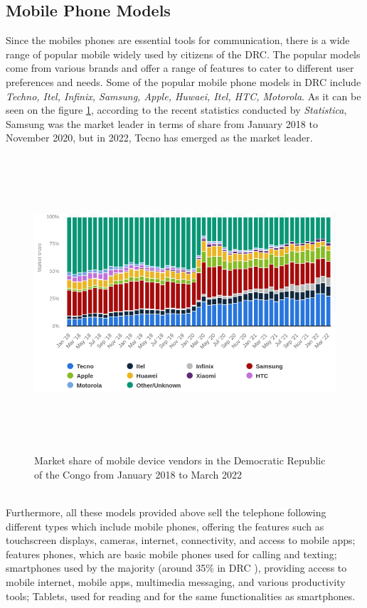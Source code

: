\documentclass[12pt,a4paper]{report}
\begin{document}
	\subsection{Mobile Phone Models}  
	Since the mobiles phones are essential tools for communication, there is a wide range of popular mobile widely used by citizens of the DRC. The popular models come from various brands and offer a range of features to cater to different user preferences and needs. Some of the popular mobile phone models in DRC include \textit{ Techno, Itel, Infinix, Samsung, Apple, Huwaei, Itel, HTC, Motorola}. As it can be seen on the figure \ref{fig:mobilevendor}, according  to the  recent statistics conducted by \textit{Statistica},
	Samsung was the market leader in terms of share from January 2018 to November 2020, but in 2022, Tecno has emerged as the market leader.
	\begin{figure}
		\centering 
		\includegraphics[width=18cm, height=11cm]{Images/mobileMarket.png}
		\caption{Market share of mobile device vendors in the Democratic Republic of the Congo from January 2018 to March 2022}
	    \captionsetup{position=top}
		\label{fig:mobilevendor} 
	\end{figure}
\\

Furthermore, all these models provided above sell the telephone following different types which include mobile phones, offering the features such as touchscreen displays, cameras, internet, connectivity, and access to mobile apps; features phones, which are basic mobile phones used for calling and texting; smartphones used by the majority (around 35\% in DRC ), providing access to mobile internet, mobile apps, multimedia messaging, and various productivity tools; Tablets, used for reading and for the same functionalities as smartphones.
\end{document}
